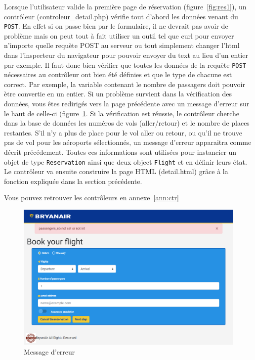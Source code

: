 \documentclass[12pt,a4paper]{article}
\begin{document}
			Lorsque l'utilisateur valide la première page de réservation (figure~\ref{fig:res1}), un contrôleur (controleur\_detail.php) vérifie tout d'abord les données venant du \texttt{POST}. En effet si on passe bien par le formulaire, il ne devrait pas avoir de problème mais on peut tout à fait utiliser un outil tel que curl pour envoyer n'importe quelle requète POST au serveur ou tout simplement changer l'html dans l'inspecteur du navigateur pour pouvoir envoyer du text au lieu d'un entier par exemple. Il faut donc bien vérifier que toutes les données de la requète \texttt{POST} nécessaires au contrôleur ont bien été définies et que le type de chacune est correct. Par exemple, la variable contenant le nombre de passagers doit pouvoir ètre convertie en un entier. Si un problème survient dans la vérification des données, vous êtes redirigés vers la page précédente avec un message d'erreur sur le haut de celle-ci (figure~\ref{fig:error}. Si la vérification est réussie, le contrôleur cherche dans la base de données les numéros de vols (aller/retour) et le nombre de places restantes. S'il n'y a plus de place pour le vol aller ou retour, ou qu'il ne trouve pas de vol pour les aéroports sélectionnés,  un message d'erreur apparaitra comme décrit précédement. Toutes ces informations sont utilisées pour instancier un objet de type \texttt{Reservation} ainsi que deux object \texttt{Flight} et en définir leurs état. Le contrôleur va ensuite construire la page HTML (detail.html) grâce à la fonction expliquée dans la section précédente.

      Vous pouvez retrouver les contrôleurs en annexe~\ref{ann:ctr}
			\begin{figure}
         \includegraphics[width=\textwidth]{Error.png}
				\caption{Message d'erreur}
				\label{fig:error}
			\end{figure}
\end{document}

